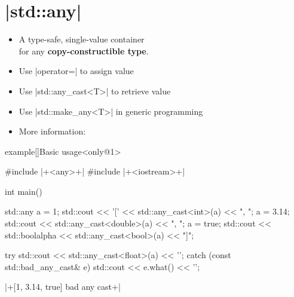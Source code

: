 \section{\CPP|std::any|}
\begin{frame}[fragile]{\insertsectionhead}
    \vspace{-3mm}
    \begin{itemize}
        \item A type-safe, single-value container\\ for any \textbf{copy-constructible type}.
        \item Use \CPP|operator=| to assign value
        \item Use \CPP|std::any_cast<T>| to retrieve value
        \item Use \CPP|std::make_any<T>| in generic programming
        \item More information: 
    \end{itemize}
\end{frame}
\begin{frame}[fragile]{}
    \begin{varblock}{example}[\textwidth]{Basic usage}<only@1>
        \begin{Cpp}
            #include |+<any>+|
            #include |+<iostream>+|

            int main()
            {
                std::any a = 1;
                std::cout << '[' << std::any_cast<int>(a) << ", ";
                a = 3.14;
                std::cout << std::any_cast<double>(a) << ", ";
                a = true;
                std::cout << std::boolalpha
                          << std::any_cast<bool>(a) << "]\n";

                try {
                    std::cout << std::any_cast<float>(a) << '\n';
                }
                catch (const std::bad_any_cast& e) {
                    std::cout << e.what() << '\n';
                }
            }
        \end{Cpp}
        \begin{Bash}[numbers=none]
            |+[1, 3.14, true]
            bad any cast+|
        \end{Bash}
    \end{varblock}
\end{frame}

